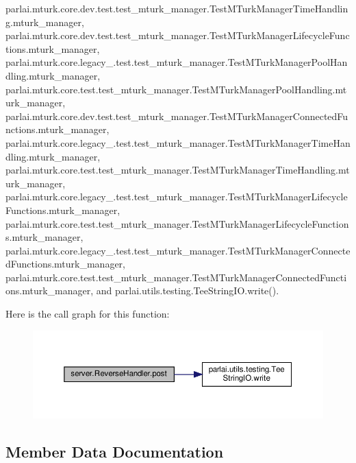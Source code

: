 parlai.\+mturk.\+core.\+dev.\+test.\+test\+\_\+mturk\+\_\+manager.\+Test\+M\+Turk\+Manager\+Time\+Handling.\+mturk\+\_\+manager, parlai.\+mturk.\+core.\+dev.\+test.\+test\+\_\+mturk\+\_\+manager.\+Test\+M\+Turk\+Manager\+Lifecycle\+Functions.\+mturk\+\_\+manager, parlai.\+mturk.\+core.\+legacy\+\_.\+test.\+test\+\_\+mturk\+\_\+manager.\+Test\+M\+Turk\+Manager\+Pool\+Handling.\+mturk\+\_\+manager, parlai.\+mturk.\+core.\+test.\+test\+\_\+mturk\+\_\+manager.\+Test\+M\+Turk\+Manager\+Pool\+Handling.\+mturk\+\_\+manager, parlai.\+mturk.\+core.\+dev.\+test.\+test\+\_\+mturk\+\_\+manager.\+Test\+M\+Turk\+Manager\+Connected\+Functions.\+mturk\+\_\+manager, parlai.\+mturk.\+core.\+legacy\+\_.\+test.\+test\+\_\+mturk\+\_\+manager.\+Test\+M\+Turk\+Manager\+Time\+Handling.\+mturk\+\_\+manager, parlai.\+mturk.\+core.\+test.\+test\+\_\+mturk\+\_\+manager.\+Test\+M\+Turk\+Manager\+Time\+Handling.\+mturk\+\_\+manager, parlai.\+mturk.\+core.\+legacy\+\_.\+test.\+test\+\_\+mturk\+\_\+manager.\+Test\+M\+Turk\+Manager\+Lifecycle\+Functions.\+mturk\+\_\+manager, parlai.\+mturk.\+core.\+test.\+test\+\_\+mturk\+\_\+manager.\+Test\+M\+Turk\+Manager\+Lifecycle\+Functions.\+mturk\+\_\+manager, parlai.\+mturk.\+core.\+legacy\+\_.\+test.\+test\+\_\+mturk\+\_\+manager.\+Test\+M\+Turk\+Manager\+Connected\+Functions.\+mturk\+\_\+manager, parlai.\+mturk.\+core.\+test.\+test\+\_\+mturk\+\_\+manager.\+Test\+M\+Turk\+Manager\+Connected\+Functions.\+mturk\+\_\+manager, and parlai.\+utils.\+testing.\+Tee\+String\+I\+O.\+write().

Here is the call graph for this function\+:
\nopagebreak
\begin{figure}[H]
\begin{center}
\leavevmode
\includegraphics[width=350pt]{classserver_1_1ReverseHandler_a3a51f6fb8e9da913acf8bb9719bebbe2_cgraph}
\end{center}
\end{figure}


\subsection{Member Data Documentation}
\mbox{\label{classserver_1_1ReverseHandler_a69830af3298059fb4e9a27e3d1398437}} 
